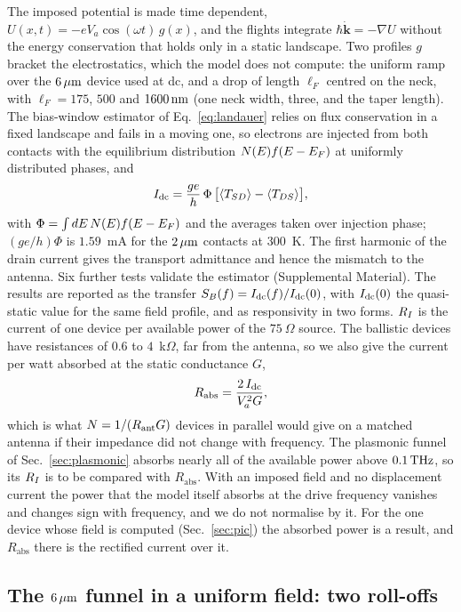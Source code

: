 The imposed potential is made time dependent, $U(x,t)=-eV_{a}\cos(\omega
t)\,g(x)$, and the flights integrate $\hbar\dot{\bm{k}}=-\nabla U$ without
the energy conservation that holds only in a static landscape. Two profiles
$g$ bracket the electrostatics, which the model does not compute: the
uniform ramp over the $6\,\mu\mathrm{m}$ device used at dc, and a drop of length
$\ell_{F}$ centred on the neck, with $\ell_{F}=175$, $500$ and $1600\,\mathrm{nm}$
(one neck width, three, and the taper length). The bias-window estimator of
Eq.~\eqref{eq:landauer} relies on flux conservation in a fixed landscape and
fails in a moving one, so electrons are injected from both contacts with the
equilibrium distribution $N(E)f(E-E_{F})$ at uniformly distributed phases, and
\begin{equation}
I_{\mathrm{dc}}=\frac{g e}{h}\,\Phi\,\bigl[\langle T_{SD}\rangle-\langle T_{DS}\rangle\bigr],
\label{eq:twosided}
\end{equation}
with $\Phi=\int dE\,N(E)f(E-E_{F})$ and the averages taken over injection
phase; $(ge/h)\Phi$ is $1.59$~mA
for the $2\,\mu\mathrm{m}$ contacts at $300$~K. The first harmonic of the drain current
gives the transport admittance and hence the mismatch to
the antenna. Six further tests validate the estimator
(Supplemental Material). The results are reported as the transfer
$S_{B}(f)=I_{\mathrm{dc}}(f)/I_{\mathrm{dc}}(0)$, with $I_{\mathrm{dc}}(0)$ the quasi-static value for the
same field profile, and as responsivity in two forms. $R_{I}$ is the current
of one device per available power of the $75\ \Omega$ source. The ballistic devices
have resistances of $0.6$ to $4$~k$\Omega$, far from the antenna, so we
also give the current per watt absorbed at the static conductance $G$,
\begin{equation}
R_{\mathrm{abs}}=\frac{2\,I_{\mathrm{dc}}}{V_{a}^{2}G},
\label{eq:rabs}
\end{equation}
which is what $N=1/(R_{\mathrm{ant}} G)$ devices in parallel would give on a matched
antenna if their impedance did not change with frequency. The plasmonic
funnel of Sec.~\ref{sec:plasmonic} absorbs nearly all of the available
power above $0.1\,\mathrm{THz}$, so its $R_{I}$ is to be compared with
$R_{\mathrm{abs}}$. With an imposed field and no displacement current the
power that the model itself absorbs at the drive frequency vanishes and
changes sign with frequency, and we do not normalise by it. For
the one device whose field is computed (Sec.~\ref{sec:pic}) the absorbed
power is a result, and $R_{\mathrm{abs}}$ there is the rectified current
over it.

\subsection{The $6\,\mu\mathrm{m}$ funnel in a uniform field: two roll-offs}

